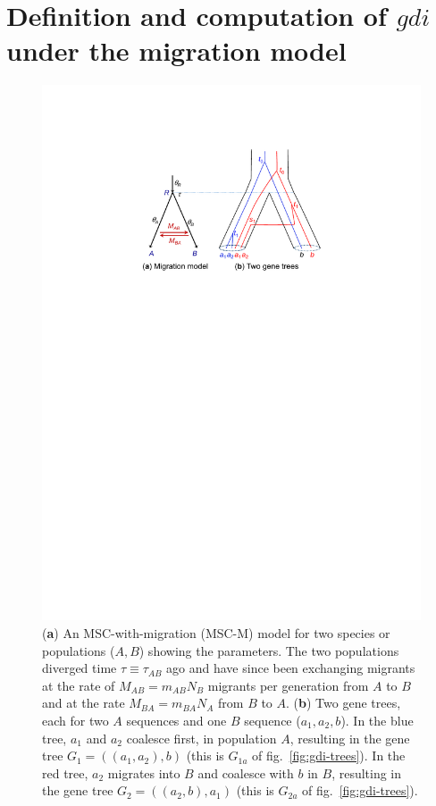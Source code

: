 \documentclass{article1}
\begin{document}
\section{Definition and computation of $gdi$ under the migration model}

\begin{figure} [t]
   \centering %
   \includegraphics[scale=0.6]{figs/fig-tree-mscm} %
   
   \caption{(\textbf{a}) An MSC-with-migration (MSC-M) model for two species or
   populations ($A,B$) showing the parameters.  The two populations diverged time $\tau
   \equiv \tau_{AB}$ ago and have since been exchanging migrants at the rate of $M_{AB} =
   m_{AB}N_B$ migrants per generation from $A$ to $B$ and at the rate $M_{BA} = m_{BA}N_A$
   from $B$ to $A$.  (\textbf{b}) Two gene trees, each for two $A$ sequences and one $B$
   sequence ($a_1, a_2, b$).  In the blue tree, $a_1$ and $a_2$ coalesce first, in
   population $A$, resulting in the gene tree $G_1 = ((a_1,a_2),b)$ (this is $G_{1a}$ of
   fig.~\ref{fig:gdi-trees}).  In the red tree, $a_2$ migrates into $B$ and coalesce with
   $b$ in $B$, resulting in the gene tree $G_2 = ((a_2,b),a_1)$ (this is $G_{2a}$ of
   fig.~\ref{fig:gdi-trees}). %
} \label{fig:tree-mscm}
\end{figure}
\end{document}
